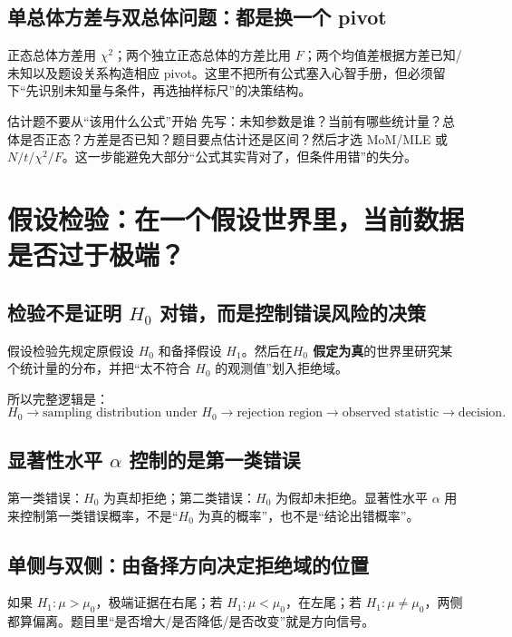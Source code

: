 \documentclass[11pt,a4paper,openany]{ctexbook}
\newcommand{\key}[1]{\textbf{\color{deep}#1}}
\begin{document}
\section{单总体方差与双总体问题：都是换一个 pivot}
正态总体方差用 $\chi^2$；两个独立正态总体的方差比用 $F$；两个均值差根据方差已知/未知以及题设关系构造相应 pivot。这里不把所有公式塞入心智手册，但必须留下“先识别未知量与条件，再选抽样标尺”的决策结构。

\begin{examBox}{估计题不要从“该用什么公式”开始}
先写：未知参数是谁？当前有哪些统计量？总体是否正态？方差是否已知？题目要点估计还是区间？然后才选 MoM/MLE 或 $N/t/\chi^2/F$。这一步能避免大部分“公式其实背对了，但条件用错”的失分。
\end{examBox}

\chapter{假设检验：在一个假设世界里，当前数据是否过于极端？}

\section{检验不是证明 \texorpdfstring{$H_0$}{H0} 对错，而是控制错误风险的决策}
假设检验先规定原假设 $H_0$ 和备择假设 $H_1$。然后在\key{$H_0$ 假定为真}的世界里研究某个统计量的分布，并把“太不符合 $H_0$ 的观测值”划入拒绝域。

所以完整逻辑是：
\[
\boxed{H_0\to\text{sampling distribution under }H_0\to\text{rejection region}\to\text{observed statistic}\to\text{decision}.}
\]

\section{显著性水平 \texorpdfstring{$\alpha$}{alpha} 控制的是第一类错误}
第一类错误：$H_0$ 为真却拒绝；第二类错误：$H_0$ 为假却未拒绝。显著性水平 $\alpha$ 用来控制第一类错误概率，不是“$H_0$ 为真的概率”，也不是“结论出错概率”。

\section{单侧与双侧：由备择方向决定拒绝域的位置}
如果 $H_1:\mu>\mu_0$，极端证据在右尾；若 $H_1:\mu<\mu_0$，在左尾；若 $H_1:\mu\ne\mu_0$，两侧都算偏离。题目里“是否增大/是否降低/是否改变”就是方向信号。
\end{document}
